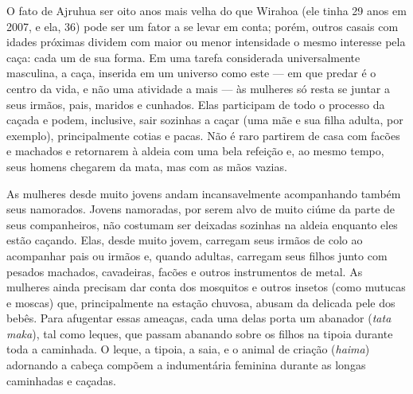 O fato de Ajruhua ser oito anos mais velha do que Wirahoa (ele tinha 29
anos em 2007, e ela, 36) pode ser um fator a se levar em conta; porém,
outros casais com idades próximas dividem com maior ou menor intensidade
o mesmo interesse pela caça: cada um de sua forma. Em uma tarefa
considerada universalmente masculina, a caça, inserida em um universo
como este --- em que predar é o centro da vida, e não uma atividade a mais
--- às mulheres só resta se juntar a seus irmãos, pais, maridos e
cunhados. Elas participam de todo o processo da caçada e podem,
inclusive, sair sozinhas a caçar (uma mãe e sua filha adulta, por
exemplo), principalmente cotias e pacas. Não é raro partirem de casa com
facões e machados e retornarem à aldeia com uma bela refeição e, ao
mesmo tempo, seus homens chegarem da mata, mas com as mãos vazias.

As mulheres desde muito jovens andam incansavelmente acompanhando também
seus namorados. Jovens namoradas, por serem alvo de muito ciúme da parte
de seus companheiros, não costumam ser deixadas sozinhas na aldeia
enquanto eles estão caçando. Elas, desde muito jovem, carregam seus
irmãos de colo ao acompanhar pais ou irmãos e, quando adultas, carregam
seus filhos junto com pesados machados, cavadeiras, facões e outros
instrumentos de metal. As mulheres ainda precisam dar conta dos
mosquitos e outros insetos (como mutucas e moscas) que, principalmente
na estação chuvosa, abusam da delicada pele dos bebês. Para afugentar
essas ameaças, cada uma delas porta um abanador (\emph{tata maka}), tal
como leques, que passam abanando sobre os filhos na tipoia durante toda
a caminhada. O leque, a tipoia, a saia, e o animal de criação
(\emph{haima}) adornando a cabeça compõem a indumentária feminina
durante as longas caminhadas e caçadas.

